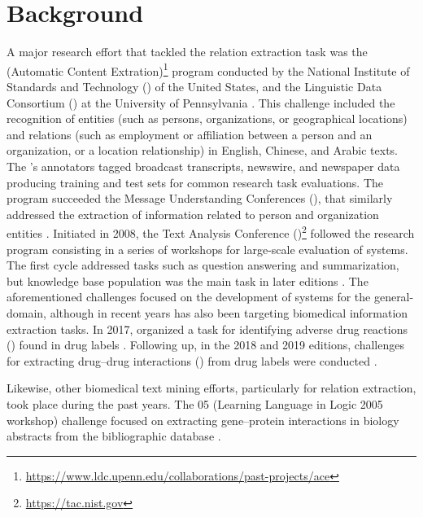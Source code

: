 \section{Background}

A major research effort that tackled the relation extraction task was the  (Automatic Content Extration)\footnote{\url{https://www.ldc.upenn.edu/collaborations/past-projects/ace}} program conducted by the National Institute of Standards and Technology () of the United States, and the Linguistic Data Consortium () at the University of Pennsylvania \parencite{doddington2004a}.
This challenge included the recognition of entities (such as persons, organizations, or geographical locations)  and relations (such as employment or affiliation between a person and an organization, or a location relationship) in English, Chinese, and Arabic texts.
The 's  annotators tagged broadcast transcripts, newswire, and newspaper data producing training and test sets for common research task evaluations.
The  program succeeded the Message Understanding Conferences (), that similarly addressed the extraction of information related to person and organization entities \parencite{sundheim1996a,grishman1996a}.
Initiated in 2008, the Text Analysis Conference ()\footnote{\url{https://tac.nist.gov}} followed the  research program consisting in a series of workshops for large-scale evaluation of  systems.
The first  cycle addressed tasks such as question answering and summarization, but knowledge base population was the main task in later editions \parencite{ji2010a,ji2011b,ji2011a,ellis2012a,surdeanu2013a}.
The aforementioned challenges focused on the development of  systems for the general-domain, although in recent years  has also been targeting biomedical information extraction tasks.
In 2017,  organized a task for identifying adverse drug reactions () found in drug labels \parencite{roberts2017a}.
Following up, in the 2018 and 2019 editions, challenges for extracting drug--drug interactions () from drug labels were conducted \parencite{demnerfushman2018a,goodwin2019a}.

Likewise, other biomedical text mining efforts, particularly for relation extraction, took place during the past years.
The 05 (Learning Language in Logic 2005 workshop) challenge focused on extracting gene--protein interactions in biology abstracts from the  bibliographic database \parencite{nedellec2005a}.


